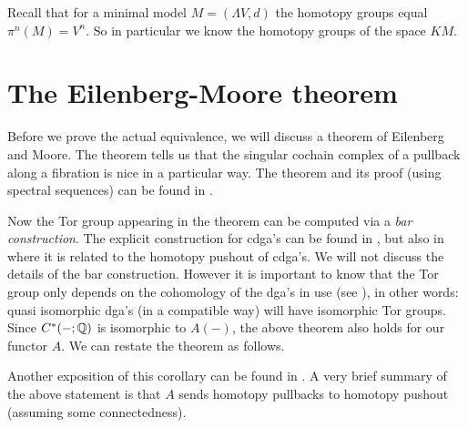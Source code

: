 Recall that for a minimal model $M = (\Lambda V, d)$ the homotopy groups equal $\pi^n(M) = V^n$. So in particular we know the homotopy groups of the space $KM$.



\section{The Eilenberg-Moore theorem}
Before we prove the actual equivalence, we will discuss a theorem of Eilenberg and Moore. The theorem tells us that the singular cochain complex of a pullback along a fibration is nice in a particular way. The theorem and its proof (using spectral sequences) can be found in \cite[Theorem 7.14]{mccleary}.


Now the Tor group appearing in the theorem can be computed via a \emph{bar construction}. The explicit construction for cdga's can be found in \cite{bousfield}, but also in \cite{olsson} where it is related to the homotopy pushout of cdga's. We will not discuss the details of the bar construction. However it is important to know that the Tor group only depends on the cohomology of the dga's in use (see \cite[Corollary 7.7]{mccleary}), in other words: quasi isomorphic dga's (in a compatible way) will have isomorphic Tor groups. Since $C^\ast(-;\mathbb{Q})$ is isomorphic to $A(-)$, the above theorem also holds for our functor $A$. We can restate the theorem as follows.

Another exposition of this corollary can be found in \cite[Section 8.4]{berglund}. A very brief summary of the above statement is that $A$ sends homotopy pullbacks to homotopy pushout (assuming some connectedness).


